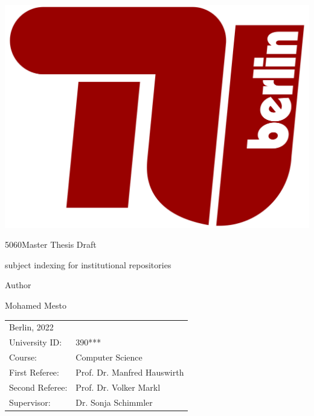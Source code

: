\documentclass{article}      %
\makeatletter
\newcommand\HUGE{\@setfontsize\Huge{50}{60}}
\makeatother
\begin{document}
\thispagestyle{empty}
\begin{center}
\begin{minipage}{0.9\linewidth}
\centering
	      		 
    \includegraphics[width=0.5\linewidth]{figures/tub.jpg}
    \vspace{1cm}

	{\scshape{\HUGE Master Thesis Draft\par}}
	\vspace{1cm}
    {\scshape{\Large subject indexing for institutional repositories\par}}
    \vspace{1.5cm}
  
 Author  \linebreak
 {\Large Mohamed Mesto \par}
 	\vspace{1.5cm}

\flushleft

\begin{tabular}{ll}
Berlin, 2022 \linebreak
\vspace{1cm}&   \\
  University ID: & 390*** \vspace{0.3cm} \\ 
  Course: & Computer Science \vspace{0.3cm} \\
  First Referee: & Prof. Dr. Manfred Hauswirth \vspace{0.3cm} \\
  Second Referee: & Prof. Dr. Volker Markl \vspace{0.3cm} \\
  Supervisor: & Dr. Sonja Schimmler \\
 \end{tabular}

\end{minipage}
\end{center}
\clearpage
\end{document}
